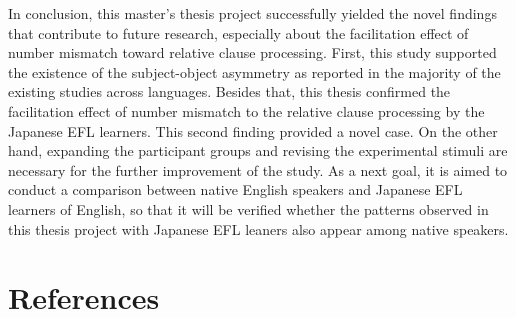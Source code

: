 \documentclass[
]{article}
\begin{document}
In conclusion, this master's thesis project successfully yielded the
novel findings that contribute to future research, especially about the
facilitation effect of number mismatch toward relative clause
processing. First, this study supported the existence of the
subject-object asymmetry as reported in the majority of the existing
studies across languages. Besides that, this thesis confirmed the
facilitation effect of number mismatch to the relative clause processing
by the Japanese EFL learners. This second finding provided a novel case.
On the other hand, expanding the participant groups and revising the
experimental stimuli are necessary for the further improvement of the
study. As a next goal, it is aimed to conduct a comparison between
native English speakers and Japanese EFL learners of English, so that it
will be verified whether the patterns observed in this thesis project
with Japanese EFL leaners also appear among native speakers.

\clearpage
{}

\section*{References}\label{references}
\end{document}
